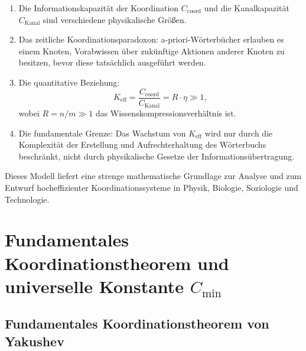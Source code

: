 \documentclass[11pt,a4paper]{article}
\begin{document}
	\begin{enumerate}
		\item Die Informationskapazität der Koordination $C_{\text{coord}}$ und die Kanalkapazität $C_{\text{Kanal}}$ sind verschiedene physikalische Größen.
		
		\item Das zeitliche Koordinationsparadoxon: a-priori-Wörterbücher erlauben es einem Knoten, Vorabwissen über zukünftige Aktionen anderer Knoten zu besitzen, bevor diese tatsächlich ausgeführt werden.
		
		\item Die quantitative Beziehung:
		\[
		K_{\mathrm{eff}} = \frac{C_{\text{coord}}}{C_{\text{Kanal}}} = R \cdot \eta \gg 1,
		\]
		wobei $R = n/m \gg 1$ das Wissenskompressionsverhältnis ist.
		
		\item Die fundamentale Grenze: Das Wachstum von $K_{\mathrm{eff}}$ wird nur durch die Komplexität der Erstellung und Aufrechterhaltung des Wörterbuchs beschränkt, nicht durch physikalische Gesetze der Informationsübertragung.
	\end{enumerate}
	
	Dieses Modell liefert eine strenge mathematische Grundlage zur Analyse und zum Entwurf hocheffizienter Koordinationssysteme in Physik, Biologie, Soziologie und Technologie.
	
	
	\section{Fundamentales Koordinationstheorem und universelle Konstante \texorpdfstring{$C_{\min}$}{C\_min}}
	\label{sec:fundamental-theorem}
	
	\subsection{Fundamentales Koordinationstheorem von Yakushev}
	
\end{document}
